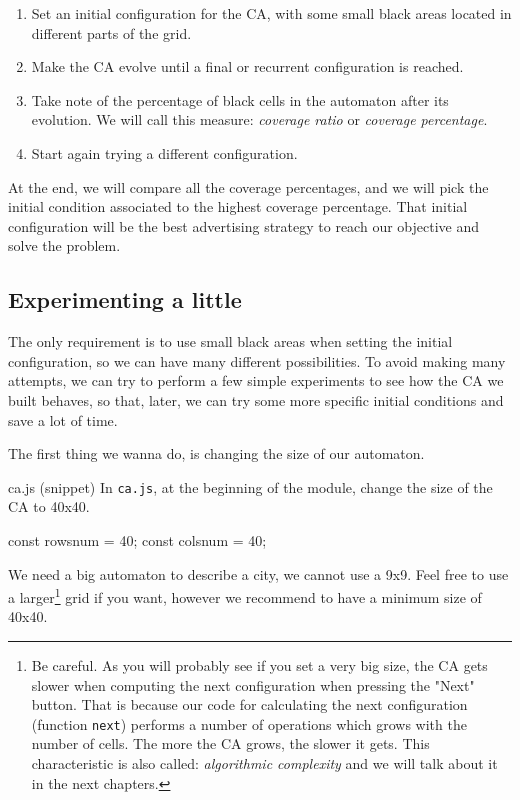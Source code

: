 \begin{enumerate}
\item Set an initial configuration for the CA, with some small black areas located in
different parts of the grid.
\item Make the CA evolve until a final or recurrent configuration is reached.
\item Take note of the percentage of black cells in the automaton after its evolution. We will call this
measure: \textit{coverage ratio} or \textit{coverage percentage}.
\item Start again trying a different configuration.
\end{enumerate}

At the end, we will compare all the coverage percentages, and we will pick the initial condition
associated to the highest coverage percentage. That initial configuration will be the best
advertising strategy to reach our objective and solve the problem.

\subsection{Experimenting a little}
The only requirement is to use small black areas when setting the initial configuration, so
we can have many different possibilities. To avoid making many attempts, we can try to perform
a few simple experiments to see how the CA we built behaves, so that, later, we can try some more
specific initial conditions and save a lot of time.

The first thing we wanna do, is changing the size of our automaton.

\begin{programcode}{ca.js (snippet)}
In \texttt{ca.js}, at the beginning of the module, change the size of the CA to 40x40.
\begin{code}
const rowsnum = 40;
const colsnum = 40;
\end{code}
\end{programcode}

We need a big automaton to describe a city, we cannot use a 9x9. Feel free to use a 
larger\footnote{Be careful. As you will probably see if you set a very big size, the CA gets slower when computing the next configuration when pressing the "Next" button. That is because our code for calculating the next configuration
(function \texttt{next}) performs a number of operations which grows with the number of cells.
The more the CA grows, the slower it gets. This characteristic is also called:
\textit{algorithmic complexity} and we will talk about it in the next chapters.} grid if
you want, however we recommend to have a minimum size of 40x40.\\

